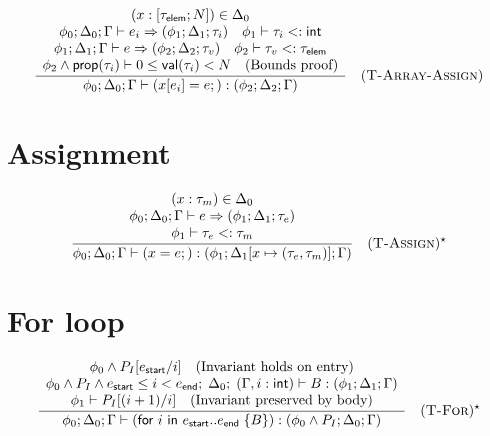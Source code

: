 $$
  \frac{
    \begin{array}{c}
      (x: [\tau_\textsf{elem}; N]) \in \Delta_0                                                                                 \\
      \phi_0; \Delta_0; \Gamma \vdash e_i \Rightarrow (\phi_1; \Delta_1; \tau_i) \quad \phi_1 \vdash \tau_i <: \textsf{int}     \\
      \phi_1; \Delta_1; \Gamma \vdash e \Rightarrow (\phi_2; \Delta_2; \tau_v) \quad \phi_2 \vdash \tau_v <: \tau_\textsf{elem} \\
      \phi_2 \wedge \textsf{prop}(\tau_i) \vdash 0 \le \textsf{val}(\tau_i) < N \quad \text{(Bounds proof)}
    \end{array}
  }{
    \phi_0; \Delta_0; \Gamma \vdash (x[e_i] = e;) : (\phi_2; \Delta_2; \Gamma)
  } \quad (\textsc{T-Array-Assign})
$$

\section*{Assignment}

$$
  \frac{
    \begin{array}{c}
      (x: \tau_m) \in \Delta_0                                                 \\
      \phi_0; \Delta_0; \Gamma \vdash e \Rightarrow (\phi_1; \Delta_1; \tau_e) \\
      \phi_1 \vdash \tau_e <: \tau_m
    \end{array}
  }{
    \phi_0; \Delta_0; \Gamma \vdash (x = e;) : (\phi_1; \Delta_1[x \mapsto (\tau_e, \tau_m)]; \Gamma)
  } \quad (\textsc{T-Assign})^\star
$$

\section*{For loop}

$$
  \frac{
    \begin{array}{c}
      \phi_0 \wedge P_I[e_\textsf{start}/i] \quad \text{(Invariant holds on entry)}                                                                   \\
      \phi_0 \wedge P_I \wedge e_\textsf{start} \le i < e_\textsf{end};\; \Delta_0;\; (\Gamma, i: \textsf{int}) \vdash B : (\phi_1; \Delta_1; \Gamma) \\
      \phi_1 \vdash P_I[(i+1)/i] \quad \text{(Invariant preserved by body)}
    \end{array}
  }{
    \phi_0; \Delta_0; \Gamma \vdash (\textsf{for } i \textsf{ in } e_\textsf{start}..e_\textsf{end}\;\{B\}) : (\phi_0 \wedge P_I; \Delta_0; \Gamma)
  } \quad (\textsc{T-For})^\star
$$

